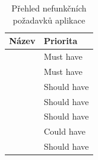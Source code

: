 \begin{table}[!ht]
    \centering
    \begin{tabular}{@{} l l @{}}
        \toprule
        Název & Priorita \\
        \midrule
        \nameref{sec:np-remove-extra-functions} & Must have \\
        \nameref{sec:np-new-ui-design} & Must have \\
        \nameref{sec:np-component-library} & Should have \\
        \nameref{sec:np-automated-tests} & Should have \\
        \nameref{sec:np-generated-api-classes} & Should have \\
        \nameref{sec:np-animations-effects} & Could have \\
        \nameref{sec:np-pwa-deployment} & Should have \\
        
        \bottomrule
    \end{tabular}
    \captionsetup{justification=centering}
    \caption{Přehled nefunkčních požadavků aplikace}
    \label{table:non-functional-requirements-summary}
\end{table}
